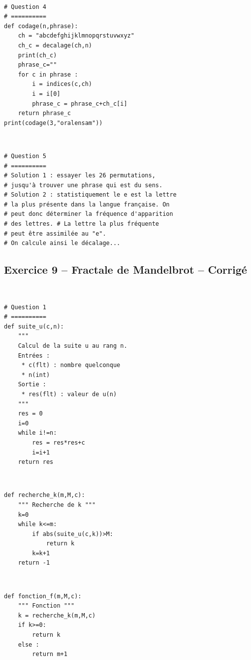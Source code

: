 \documentclass[10pt,fleqn]{article} %
\begin{document}
\begin{corrige}
$\quad$
\begin{lstlisting}
# Question 4
# ==========
def codage(n,phrase):
    ch = "abcdefghijklmnopqrstuvwxyz"
    ch_c = decalage(ch,n)
    print(ch_c)
    phrase_c=""
    for c in phrase :
        i = indices(c,ch)
        i = i[0]
        phrase_c = phrase_c+ch_c[i]
    return phrase_c
print(codage(3,"oralensam"))
\end{lstlisting}
\end{corrige}

\begin{corrige}
$\quad$
\begin{lstlisting}
# Question 5
# ==========
# Solution 1 : essayer les 26 permutations, 
# jusqu'à trouver une phrase qui est du sens.
# Solution 2 : statistiquement le e est la lettre
# la plus présente dans la langue française. On
# peut donc déterminer la fréquence d'apparition 
# des lettres. # La lettre la plus fréquente 
# peut être assimilée au "e".
# On calcule ainsi le décalage...
\end{lstlisting}
\end{corrige}

\subsection*{Exercice 9 -- Fractale de Mandelbrot -- Corrigé}
\begin{corrige}
$\quad$
\begin{lstlisting}
# Question 1 
# ==========
def suite_u(c,n):
    """
    Calcul de la suite u au rang n.
    Entrées : 
     * c(flt) : nombre quelconque
     * n(int)
    Sortie : 
     * res(flt) : valeur de u(n)
    """
    res = 0
    i=0
    while i!=n:
        res = res*res+c
        i=i+1
    return res
\end{lstlisting}
\end{corrige}

\begin{corrige}
$\quad$
\begin{lstlisting}
def recherche_k(m,M,c):
    """ Recherche de k """
    k=0
    while k<=m:
        if abs(suite_u(c,k))>M:
            return k
        k=k+1
    return -1
\end{lstlisting}
\end{corrige}

\begin{corrige}
$\quad$
\begin{lstlisting}
def fonction_f(m,M,c):
    """ Fonction """
    k = recherche_k(m,M,c)
    if k>=0:
        return k
    else :
        return m+1
\end{lstlisting}
\end{corrige}
\end{document}
